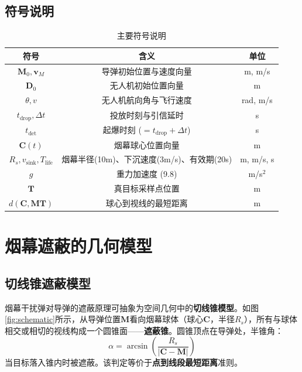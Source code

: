 \documentclass[12pt,a4paper]{ctexart}
\begin{document}
\subsection{符号说明}

\begin{table}[H]
\centering
\caption{主要符号说明}
\begin{tabular}{c|c|c}
\toprule
\textbf{符号} & \textbf{含义} & \textbf{单位} \\
\midrule
$\mathbf{M}_0, \mathbf{v}_M$ & 导弹初始位置与速度向量 & m, m/s \\
$\mathbf{D}_0$ & 无人机初始位置向量 & m \\
$\theta, v$ & 无人机航向角与飞行速度 & rad, m/s \\
$t_{\text{drop}}, \Delta t$ & 投放时刻与引信延时 & s \\
$t_{\text{det}}$ & 起爆时刻 ($=t_{\text{drop}}+\Delta t$) & s \\
$\mathbf{C}(t)$ & 烟幕球心位置向量 & m \\
$R_s, v_{\text{sink}}, T_{\text{life}}$ & 烟幕半径(10m)、下沉速度(3m/s)、有效期(20s) & m, m/s, s \\
$g$ & 重力加速度 (9.8) & m/s$^2$ \\
$\mathbf{T}$ & 真目标采样点位置 & m \\
$d(\mathbf{C}, \mathbf{MT})$ & 球心到视线的最短距离 & m \\
\bottomrule
\end{tabular}
\end{table}

\section{烟幕遮蔽的几何模型}

\subsection{切线锥遮蔽模型}

烟幕干扰弹对导弹的遮蔽原理可抽象为空间几何中的\textbf{切线锥模型}。如图\ref{fig:schematic}所示，从导弹位置$\mathbf{M}$看向烟幕球体（球心$\mathbf{C}$，半径$R_s$），所有与球体相交或相切的视线构成一个圆锥面——\textbf{遮蔽锥}。圆锥顶点在导弹处，半锥角：
\begin{equation}
    \alpha = \arcsin\left(\frac{R_s}{|\mathbf{C} - \mathbf{M}|}\right)
\end{equation}
当目标落入锥内时被遮蔽。该判定等价于\textbf{点到线段最短距离}准则。
\end{document}

